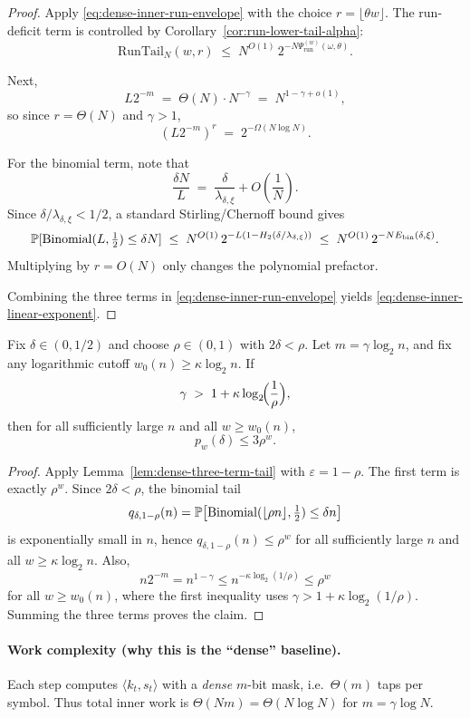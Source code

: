 \begin{proof}
Apply \eqref{eq:dense-inner-run-envelope} with the choice $r=\lfloor \theta w\rfloor$.
The run-deficit term is controlled by Corollary~\ref{cor:run-lower-tail-alpha}:
\[
\mathrm{RunTail}_N(w,r)
\;\le\;
N^{O(1)}\,2^{-N\Psi_{\mathrm{run}}^{(w)}(\omega,\theta)}.
\]

Next,
\[
L2^{-m}
\;=\;
\Theta(N)\cdot N^{-\gamma}
\;=\;
N^{1-\gamma+o(1)},
\]
so since $r=\Theta(N)$ and $\gamma>1$,
\[
(L2^{-m})^r
\;=\;
2^{-\Omega(N\log N)}.
\]

For the binomial term, note that
\[
\frac{\delta N}{L}
\;=\;
\frac{\delta}{\lambda_{\delta,\xi}}+O\!\left(\frac{1}{N}\right).
\]
Since \(\delta/\lambda_{\delta,\xi}<1/2\), a standard Stirling/Chernoff bound gives
\[
\mathbb{P}[\operatorname{Binomial}(L,\tfrac12)\le \delta N]
\;\le\;
N^{O(1)}\,2^{-L\left(1-H_2(\delta/\lambda_{\delta,\xi})\right)}
\;\le\;
N^{O(1)}\,2^{-N E_{\mathrm{bin}}(\delta,\xi)}.
\]
Multiplying by $r=O(N)$ only changes the polynomial prefactor.

Combining the three terms in \eqref{eq:dense-inner-run-envelope} yields
\eqref{eq:dense-inner-linear-exponent}.
\end{proof}




\begin{corollary}
\label{cor:dense-inner-constant-geometric}
Fix \(\delta\in(0,1/2)\) and choose \(\rho\in(0,1)\) with \(2\delta<\rho\).
Let \(m=\gamma\log_2 n\), and fix any logarithmic cutoff \(w_0(n)\ge \kappa\log_2 n\).
If
\[
\gamma \;>\; 1+\kappa\log_2\!\Bigl(\frac{1}{\rho}\Bigr),
\]
then for all sufficiently large \(n\) and all \(w\ge w_0(n)\),
\[
p_w(\delta)\le 3\rho^w.
\]
\end{corollary}

\begin{proof}
Apply Lemma~\ref{lem:dense-three-term-tail} with \(\varepsilon=1-\rho\).
The first term is exactly \(\rho^w\).
Since \(2\delta<\rho\), the binomial tail
\[
q_{\delta,1-\rho}(n)
=
\mathbb{P}\!\left[\operatorname{Binomial}(\lfloor \rho n\rfloor,\tfrac12)\le \delta n\right]
\]
is exponentially small in \(n\), hence \(q_{\delta,1-\rho}(n)\le \rho^w\) for all sufficiently large \(n\) and all
\(w\ge \kappa\log_2 n\).
Also,
\[
n2^{-m}=n^{1-\gamma}
\le
n^{-\kappa\log_2(1/\rho)}
\le
\rho^w
\]
for all \(w\ge w_0(n)\), where the first inequality uses
\(\gamma>1+\kappa\log_2(1/\rho)\).
Summing the three terms proves the claim.
\end{proof}

\paragraph{Work complexity (why this is the ``dense'' baseline).}
Each step computes $\langle k_t,s_t\rangle$ with a \emph{dense} $m$-bit mask, i.e.\ $\Theta(m)$ taps per symbol.
Thus total inner work is $\Theta(Nm)=\Theta(N\log N)$ for $m=\gamma\log N$.

